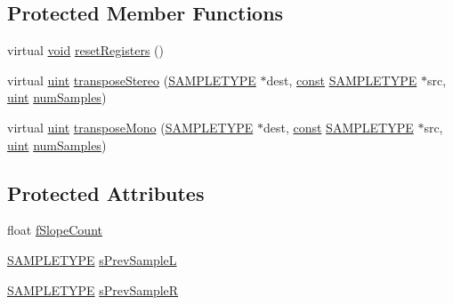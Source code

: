 \subsection*{Protected Member Functions}
\begin{DoxyCompactItemize}
\item 
virtual \hyperlink{sound_8c_ae35f5844602719cf66324f4de2a658b3}{void} \hyperlink{class_rate_transposer_float_a6c8e7373e7893e8b2a5c16c761585ea5}{reset\+Registers} ()
\item 
virtual \hyperlink{_s_t_types_8h_a91ad9478d81a7aaf2593e8d9c3d06a14}{uint} \hyperlink{class_rate_transposer_float_a176ac788453fb46fd1062e6417445134}{transpose\+Stereo} (\hyperlink{namespacesoundtouch_a97cfd29a7abb4d4b2a72f803d5b5850c}{S\+A\+M\+P\+L\+E\+T\+Y\+PE} $\ast$dest, \hyperlink{getopt1_8c_a2c212835823e3c54a8ab6d95c652660e}{const} \hyperlink{namespacesoundtouch_a97cfd29a7abb4d4b2a72f803d5b5850c}{S\+A\+M\+P\+L\+E\+T\+Y\+PE} $\ast$src, \hyperlink{_s_t_types_8h_a91ad9478d81a7aaf2593e8d9c3d06a14}{uint} \hyperlink{classsoundtouch_1_1_f_i_f_o_processor_a254a8506a4a93083c0e914aff361c674}{num\+Samples})
\item 
virtual \hyperlink{_s_t_types_8h_a91ad9478d81a7aaf2593e8d9c3d06a14}{uint} \hyperlink{class_rate_transposer_float_a36373bdcd89aba43f08b865c20645b99}{transpose\+Mono} (\hyperlink{namespacesoundtouch_a97cfd29a7abb4d4b2a72f803d5b5850c}{S\+A\+M\+P\+L\+E\+T\+Y\+PE} $\ast$dest, \hyperlink{getopt1_8c_a2c212835823e3c54a8ab6d95c652660e}{const} \hyperlink{namespacesoundtouch_a97cfd29a7abb4d4b2a72f803d5b5850c}{S\+A\+M\+P\+L\+E\+T\+Y\+PE} $\ast$src, \hyperlink{_s_t_types_8h_a91ad9478d81a7aaf2593e8d9c3d06a14}{uint} \hyperlink{classsoundtouch_1_1_f_i_f_o_processor_a254a8506a4a93083c0e914aff361c674}{num\+Samples})
\end{DoxyCompactItemize}
\subsection*{Protected Attributes}
\begin{DoxyCompactItemize}
\item 
float \hyperlink{class_rate_transposer_float_a82c68a4b4f39abb2a095841cc390e1f7}{f\+Slope\+Count}
\item 
\hyperlink{namespacesoundtouch_a97cfd29a7abb4d4b2a72f803d5b5850c}{S\+A\+M\+P\+L\+E\+T\+Y\+PE} \hyperlink{class_rate_transposer_float_aeb1ec0e078350074ec6b7f68a162abe4}{s\+Prev\+SampleL}
\item 
\hyperlink{namespacesoundtouch_a97cfd29a7abb4d4b2a72f803d5b5850c}{S\+A\+M\+P\+L\+E\+T\+Y\+PE} \hyperlink{class_rate_transposer_float_aeb80ba2fdc05cc3d51b8562bd1530bda}{s\+Prev\+SampleR}
\end{DoxyCompactItemize}
